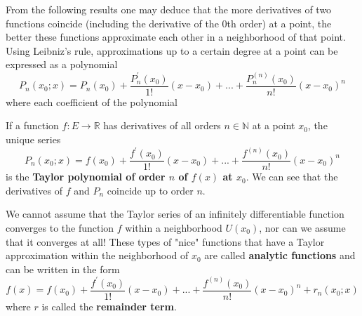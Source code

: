   From the following results one may deduce that the more derivatives of two functions coincide (including the derivative of the $0$th order) at a point, the better these functions approximate each other in a neighborhood of that point. Using Leibniz's rule, approximations up to a certain degree at a point can be expressed as a polynomial 
  \[P_n (x_0; x) = P_n (x_0) + \frac{P_n^\prime (x_0)}{1!} (x-x_0) + ... + \frac{P_n^{(n)} (x_0)}{n!} (x-x_0)^n\]
  where each coefficient of the polynomial 

  \begin{definition}
    If a function $f:E \longrightarrow \mathbb{R}$ has derivatives of all orders $n \in \mathbb{N}$ at a point $x_0$, the unique series
    \[P_n (x_0; x) = f(x_0) + \frac{f^\prime (x_0)}{1!} (x-x_0) + ... + \frac{f^{(n)} (x_0)}{n!} (x-x_0)^n\]
    is the \textbf{Taylor polynomial of order $n$ of $f(x)$ at $x_0$}. We can see that the derivatives of $f$ and $P_n$ coincide up to order $n$. 
  \end{definition}

  \begin{definition}
    We cannot assume that the Taylor series of an infinitely differentiable function converges to the function $f$ within a neighborhood $U(x_0)$, nor can we assume that it converges at all! These types of "nice" functions that have a Taylor approximation within the neighborhood of $x_0$ are called \textbf{analytic functions} and can be written in the form 
    \[f(x) =  f(x_0) + \frac{f^\prime (x_0)}{1!} (x-x_0) + ... + \frac{f^{(n)} (x_0)}{n!} (x-x_0)^n + r_n (x_0; x)\]
    where $r$ is called the \textbf{remainder term}. 
  \end{definition}

